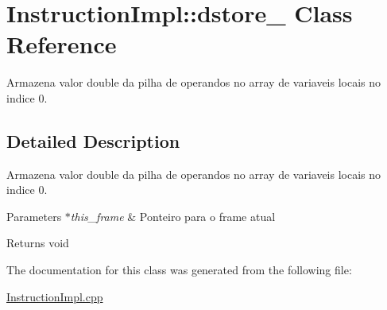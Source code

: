 \hypertarget{class_instruction_impl_1_1dstore__0}{}\section{Instruction\+Impl\+:\+:dstore\+\_ Class Reference}
\label{class_instruction_impl_1_1dstore__0}


Armazena valor double da pilha de operandos no array de variaveis locais no indice 0.  




\subsection{Detailed Description}
Armazena valor double da pilha de operandos no array de variaveis locais no indice 0. 


\begin{DoxyParams}{Parameters}
{\em $\ast$this\+\_\+frame} & Ponteiro para o frame atual \\
\hline
\end{DoxyParams}
\begin{DoxyReturn}{Returns}
void 
\end{DoxyReturn}


The documentation for this class was generated from the following file\+:\begin{DoxyCompactItemize}
\item 
\hyperlink{_instruction_impl_8cpp}{Instruction\+Impl.\+cpp}\end{DoxyCompactItemize}
